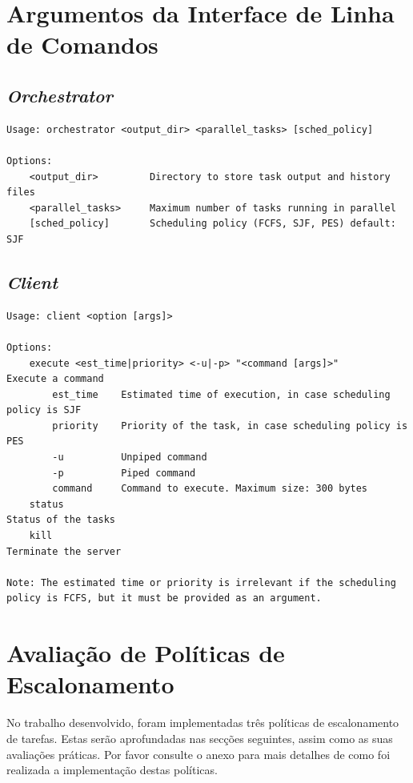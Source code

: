 \documentclass[a4paper,11pt]{scrreprt}
\begin{document}
\begin{minipage}{\textwidth}
\chapter{Argumentos da Interface de Linha de Comandos}
    \section{\textit{Orchestrator}}
\begin{lstlisting}
Usage: orchestrator <output_dir> <parallel_tasks> [sched_policy]

Options:
    <output_dir>         Directory to store task output and history files
    <parallel_tasks>     Maximum number of tasks running in parallel
    [sched_policy]       Scheduling policy (FCFS, SJF, PES) default: SJF
\end{lstlisting}
    \section{\textit{Client}}
\begin{lstlisting}
Usage: client <option [args]>

Options:
    execute <est_time|priority> <-u|-p> "<command [args]>"            Execute a command
        est_time    Estimated time of execution, in case scheduling policy is SJF
        priority    Priority of the task, in case scheduling policy is PES
        -u          Unpiped command
        -p          Piped command
        command     Command to execute. Maximum size: 300 bytes
    status                                                            Status of the tasks
    kill                                                              Terminate the server

Note: The estimated time or priority is irrelevant if the scheduling policy is FCFS, but it must be provided as an argument.
\end{lstlisting}
\end{minipage}

\chapter{Avaliação de Políticas de Escalonamento}
    No trabalho desenvolvido, foram implementadas três políticas de escalonamento de tarefas.
    Estas serão aprofundadas nas secções seguintes, assim como as suas avaliações práticas.
    Por favor consulte o anexo  para mais detalhes de como foi realizada
    a implementação destas políticas.
\end{document}
